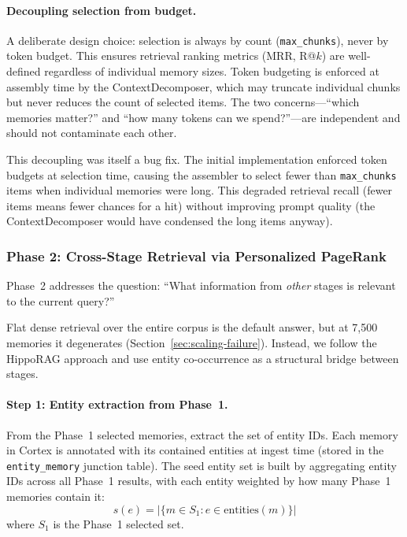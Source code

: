 \documentclass[11pt]{article}
\begin{document}
\paragraph{Decoupling selection from budget.}
A deliberate design choice: selection is always by count
(\texttt{max\_chunks}), never by token budget.  This ensures retrieval
ranking metrics (MRR, R@$k$) are well-defined regardless of individual
memory sizes.  Token budgeting is enforced at assembly time by the
ContextDecomposer, which may truncate individual chunks but never
reduces the count of selected items.  The two concerns---``which
memories matter?'' and ``how many tokens can we spend?''---are
independent and should not contaminate each other.

This decoupling was itself a bug fix.  The initial implementation
enforced token budgets at selection time, causing the assembler to
select fewer than \texttt{max\_chunks} items when individual memories
were long.  This degraded retrieval recall (fewer items means fewer
chances for a hit) without improving prompt quality (the
ContextDecomposer would have condensed the long items anyway).

\subsubsection{Phase 2: Cross-Stage Retrieval via Personalized PageRank}
\label{sec:phase2}

Phase~2 addresses the question: ``What information from \emph{other}
stages is relevant to the current query?''

Flat dense retrieval over the entire corpus is the default answer,
but at 7,500 memories it degenerates (Section~\ref{sec:scaling-failure}).
Instead, we follow the HippoRAG approach \citep{Gutierrez2024} and
use entity co-occurrence as a structural bridge between stages.

\paragraph{Step 1: Entity extraction from Phase~1.}
From the Phase~1 selected memories, extract the set of entity IDs.
Each memory in Cortex is annotated with its contained entities at
ingest time (stored in the \texttt{entity\_memory} junction table).
The seed entity set is built by aggregating entity IDs across all
Phase~1 results, with each entity weighted by how many Phase~1
memories contain it:
\begin{equation}
s(e) = |\{m \in S_1 : e \in \text{entities}(m)\}|
\label{eq:seed}
\end{equation}
where $S_1$ is the Phase~1 selected set.
\end{document}
